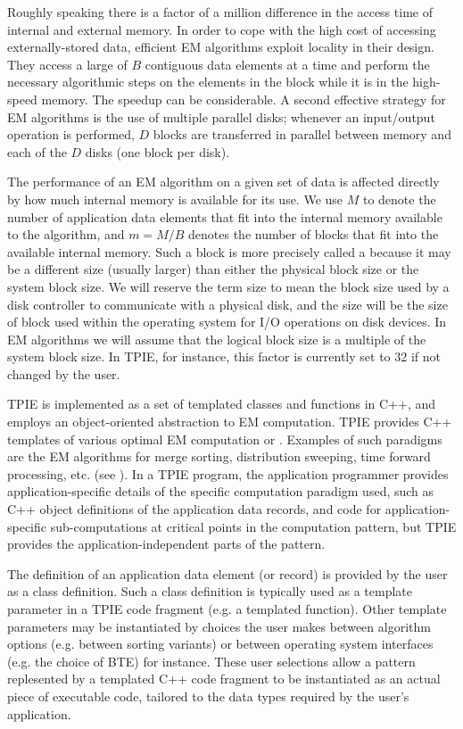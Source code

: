 Roughly speaking there is a factor of a million difference
in the access time of internal and external memory.  In
order to cope with the high cost of accessing
externally-stored data, efficient EM algorithms exploit
locality in their design.  They access a large 
of $B$ contiguous data elements at a time and perform the
necessary algorithmic steps on the elements in the block
while it is in the high-speed memory. The speedup can be
considerable.  A second effective strategy for EM algorithms
is the use of multiple parallel disks; whenever an
input/output operation is performed, $D$ blocks are
transferred in parallel between memory and each of the $D$
disks (one block per disk).

The performance of an EM algorithm on a given set of data is
affected directly by how much internal memory is available
for its use. We use $M$ to denote the number of application
data elements that fit into the internal memory available to
the algorithm, and $m=M/B$ denotes the number of blocks that
fit into the available internal memory. Such a block is more precisely
called a  because it may be a different
size (usually larger) than either the physical block size or
the system block size. We will reserve the term
 size to mean the 
block size used by a disk controller to communicate with
a physical disk, and the  size will be the
size of block used within the operating system for I/O
operations on disk devices. In EM algorithms we will assume
that the logical block size is a multiple of the system
block size. In TPIE, for instance, this factor is currently
set to 32 if not changed by the user.

TPIE is implemented as a set of templated classes and
functions in C++, and employs an object-oriented abstraction
to EM computation. TPIE provides C++ templates of various
optimal EM computation  or .
Examples of such paradigms are the EM algorithms for merge
sorting, distribution sweeping, time forward processing,
etc. (see \cite{vitter:survey}). In a TPIE program, the
application programmer provides application-specific details
of the specific computation paradigm used, such as C++
object definitions of the application data records, and code
for application-specific sub-computations at critical points
in the computation pattern, but TPIE provides the
application-independent parts of the pattern.  

The definition of an application data element (or record) is
provided by the user as a class definition.  Such a class
definition is typically used as a template parameter in a
TPIE code fragment (e.g. a templated function). Other
template parameters may be instantiated by choices the user
makes between algorithm options (e.g. between sorting
variants) or between operating system interfaces (e.g. the
choice of BTE) for instance. These user selections allow a
pattern replesented by a templated C++ code fragment to be
instantiated as an actual piece of executable code, tailored
to the data types required by the user's application.

